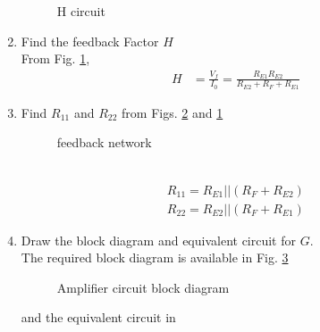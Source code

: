\begin{enumerate}[label=\thesection.\arabic*.,ref=\thesection.\theenumi]
\begin{figure}[!ht]
	\begin{center}
		
		\resizebox{\columnwidth}{!}{}
	\end{center}
\caption{H circuit}
\label{fig:ee18btech11007_circuit2}
\end{figure}
\renewcommand{\thefigure}{\theenumi}
%
\item Find the feedback Factor $H$
\\
\solution From Fig. \ref{fig:ee18btech11007_circuit2}, 
\begin{align}
    H&=\frac{V_f}{I_0}=\frac{R_{E1}R_{E2}}{R_{E2}+R_F+R_{E1}} 
\end{align}
\item Find $R_{11}$ and $R_{22}$  from Figs. \ref{fig:ee18btech11007_feedback_network} and \ref{fig:ee18btech11007_circuit2}
\begin{figure}[!ht]
	\begin{center}
		
		\resizebox{\columnwidth}{!}{}
	\end{center}
\caption{feedback network}
\label{fig:ee18btech11007_feedback_network}
\end{figure}
\\
\solution
\begin{align}
    R_{11}=R_{E1}||(R_F+R_{E2})
\end{align}
\begin{align}
    R_{22}=R_{E2}||(R_F+R_{E1})
\end{align}
%
\item Draw the block diagram and equivalent circuit for $G$.
\\
\solution The required block diagram is available in Fig. \ref{fig:ee18btech11007_G_blockdiagram} 
\begin{figure}[!ht]
	\begin{center}
		
		\resizebox{\columnwidth}{!}{}
	\end{center}
\caption{Amplifier circuit  block diagram}
\label{fig:ee18btech11007_G_blockdiagram}
\end{figure}
and the equivalent circuit in 
 \begin{figure}[!ht]
	\begin{center}
		

\end{center}
\end{figure}
\end{enumerate}

